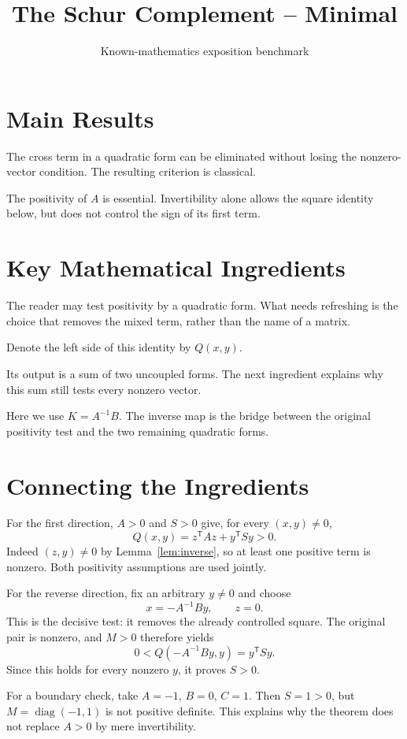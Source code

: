 \documentclass[12pt,reqno]{amsart}
\title{The Schur Complement -- Minimal}
\author{Known-mathematics exposition benchmark}
\date{}
\begin{document}
\maketitle
\section{Main Results}
The cross term in a quadratic form can be eliminated without losing the
nonzero-vector condition. The resulting criterion is classical.
\begin{theorem}\label{thm:main}

\end{theorem}
The positivity of $A$ is essential. Invertibility alone allows the square
identity below, but does not control the sign of its first term.

\section{Key Mathematical Ingredients}
The reader may test positivity by a quadratic form. What needs refreshing
is the choice that removes the mixed term, rather than the name of a matrix.
\begin{lemma}\label{lem:square}

\end{lemma}
Denote the left side of this identity by $Q(x,y)$.

Its output is a sum of two uncoupled forms. The next ingredient explains
why this sum still tests every nonzero vector.
\begin{lemma}\label{lem:inverse}

\end{lemma}
Here we use $K=A^{-1}B$. The inverse map is the bridge between the
original positivity test and the two remaining quadratic forms.

\section{Connecting the Ingredients}
For the first direction, $A>0$ and $S>0$ give, for every $(x,y)\ne0$,
\[
 Q(x,y)=z^{\mathsf T}Az+y^{\mathsf T}Sy>0.
\]
Indeed $(z,y)\ne0$ by Lemma~\ref{lem:inverse}, so at least one positive
term is nonzero. Both positivity assumptions are used jointly.

For the reverse direction, fix an arbitrary $y\ne0$ and choose
\[
 x=-A^{-1}By,\qquad z=0.
\]
This is the decisive test: it removes the already controlled square.
The original pair is nonzero, and $M>0$ therefore yields
\[
 0<Q(-A^{-1}By,y)=y^{\mathsf T}Sy.
\]
Since this holds for every nonzero $y$, it proves $S>0$.

For a boundary check, take $A=-1$, $B=0$, $C=1$. Then $S=1>0$, but
$M=\operatorname{diag}(-1,1)$ is not positive definite. This explains
why the theorem does not replace $A>0$ by mere invertibility.

\nocite{S-guide}


\end{document}

